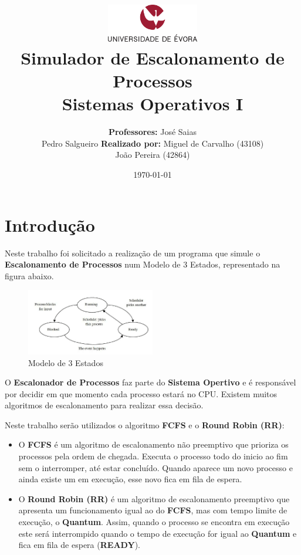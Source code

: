 \documentclass[11pt]{article}   %
\title
{
    \includegraphics[width=0.3\textwidth]{images/logo_universidade.png}
    \\[0.1cm]
    \textbf{Simulador de Escalonamento de Processos} \\
    Sistemas Operativos I
}
\author
{
    \textbf{Professores:} José Saias \\ Pedro Salgueiro
    \textbf{Realizado por:} Miguel de Carvalho (43108) \\ João Pereira (42864) 
}
\date{\today}
\begin{document}
\maketitle

\section{Introdução} 

\hspace{0,5cm}Neste trabalho foi solicitado a realização de um programa que simule o \textbf{Escalonamento de Processos} num Modelo de 3 Estados, representado na figura abaixo. \par
\begin{figure}[h!]
    \begin{center}
        \includegraphics[width=0.5\textwidth]{images/states.png}
        \caption{Modelo de 3 Estados}
    \end{center}
\end{figure}
O \textbf{Escalonador de Processos} faz parte do \textbf{Sistema Opertivo} e é responsável por decidir em que momento cada processo estará no CPU. 
Existem muitos algoritmos de escalonamento para realizar essa decisão. \par
Neste trabalho serão utilizados o algoritmo \textbf{FCFS} e o \textbf{Round Robin (RR)}:
\begin{itemize}
    \item O \textbf{FCFS} é um algoritmo de escalonamento não preemptivo que prioriza os processos pela ordem de chegada. Executa o processo todo do inicio ao fim sem o interromper, até estar concluído. Quando aparece um novo processo e ainda existe um em execução, esse novo fica em fila de espera.
    \item O \textbf{Round Robin (RR)} é um algoritmo de escalonamento preemptivo que apresenta um funcionamento igual ao do \textbf{FCFS}, mas com tempo limite de execução, o \textbf{Quantum}. Assim, quando o processo se encontra em execução este será interrompido quando o tempo de execução for igual ao \textbf{Quantum} e fica em fila de espera (\textbf{READY}). 
\end{itemize}
\end{document}

